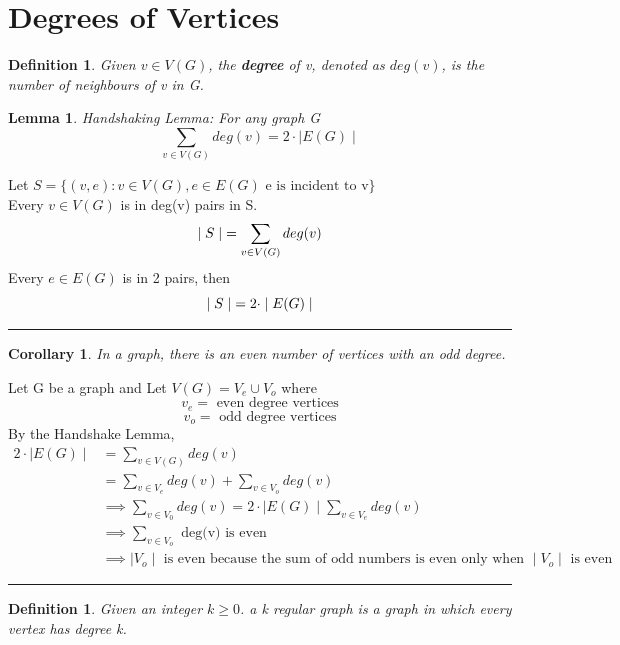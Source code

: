 \documentclass{article}
\newtheorem{lemma}[theorem]{Lemma}
\newtheorem{corollary}[theorem]{Corollary}
\newtheorem{definition}[theorem]{Definition}
\newenvironment{proof}{{\bf Proof:}}{\hfill\rule{2mm}{2mm}}
\begin{document}
\section{Degrees of Vertices}
\begin{definition}
Given \(v \in V(G)\), the \textbf{degree} of v, denoted as \(deg(v)\), is the number of neighbours of v in G. 
\end{definition}

\begin{lemma} Handshaking Lemma:
For any graph G 
$$\sum_{v\in V(G)} deg(v) = 2 \cdot \mid E(G) \mid $$
\end{lemma}

\begin{proof} Let \(S = \{ (v,e) : v \in V(G), e \in E(G)  \text{ e is incident to v}\}\)\\
Every \(v \in V(G)\) is in deg(v) pairs in S. 
$$\mid S \mid \hspace{0.1cm} = \sum_{v \in V(G)} deg(v) $$
Every \(e \in E(G)\) is in 2 pairs, then 
$$\mid S \mid \hspace{0.1cm} = 2 \cdot \mid E(G) \mid $$
\end{proof}

\begin{corollary}
In a graph, there is an even number of vertices with an odd degree.
\end{corollary}

\begin{proof}
Let G be a graph and Let \(V(G) = V_e \cup V_o\) where 
$$ v_e = \text { even degree vertices} $$
$$ v_o = \text { odd degree vertices} $$
By the Handshake Lemma, 
$$\begin{aligned}
2 \cdot \mid E(G) \mid & = \sum_{v \in V(G)} deg(v) \\
& = \sum_{v \in V_e} deg (v) + \sum_{v \in V_o} deg(v) \\
& \implies \sum_{v \in V_0} deg(v) = 2 \cdot \mid E(G) \mid \sum_{v \in V_e} deg(v)\\
& \implies \sum_{v \in V_o} \text { deg(v) is even }\\
& \implies \mid V_o \mid  \text{ is even because the sum of odd numbers is even only when } \mid V_o \mid  \text{ is even} 
\end{aligned}$$

\end{proof}

\begin{definition} Given an integer \(k \geq 0\). a k regular graph is a graph in which every vertex has degree k. 
\end{definition}
\end{document}
